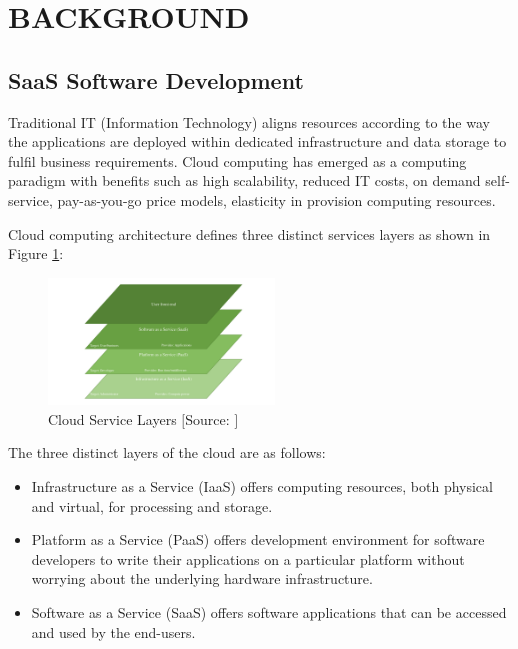 \documentclass[a4paper,twoside]{article}
\begin{document}
\section{\uppercase{Background}}
\label{sec:2 background}
\subsection{SaaS Software Development}
\label{subsec:2.1 SaaS Software Development}
\noindent Traditional IT (Information Technology) aligns resources according to the way the applications are deployed within dedicated infrastructure and data storage to fulfil business requirements. Cloud computing has emerged as a computing paradigm with benefits such as high scalability, reduced IT costs, on demand self-service, pay-as-you-go price models, elasticity in provision computing resources.

Cloud computing architecture defines three distinct services layers as shown in Figure \ref{fig:fig1}:

\begin{figure}[!h]
 \centering
 \includegraphics[width = 6cm]{Cloud_Service_Layers.pdf}
 \caption{Cloud Service Layers $[$Source: \cite{Pallis2010CloudComputing}$]$}
 \label{fig:fig1}
\end{figure}

The three distinct layers of the cloud are as follows:
\begin{itemize}
\item Infrastructure as a Service (IaaS) offers computing resources, both physical and virtual, for processing and storage.
\item Platform as a Service (PaaS) offers development environment for software developers to write their applications on a particular platform without worrying about the underlying hardware infrastructure.
\item Software as a Service (SaaS) offers software applications that can be accessed and used by the end-users.
\end{itemize}
\end{document}

